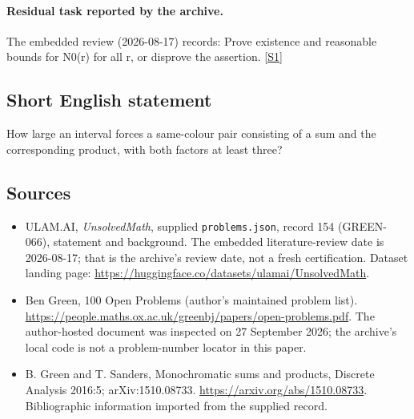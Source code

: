 \documentclass[11pt,a4paper]{article}
\newcommand{\sref}[2]{\hyperlink{source:#1:#2}{[S#2]}}
\begin{document}
\paragraph{Residual task reported by the archive.}

The embedded review (2026-08-17) records: Prove existence and reasonable bounds for N0(r) for all r, or disprove the assertion. \sref{154}{1}

\subsection{Short English statement}

How large an interval forces a same-colour pair consisting of a sum and the corresponding product, with both factors at least three?

\subsection{Sources}

{\small

\begin{itemize}

\item[\hypertarget{source:154:1}{S1}] ULAM.AI, \emph{UnsolvedMath}, supplied \texttt{problems.json}, record 154 (GREEN-066), statement and background. The embedded literature-review date is 2026-08-17; that is the archive’s review date, not a fresh certification. Dataset landing page: \url{https://huggingface.co/datasets/ulamai/UnsolvedMath}.

\item[\hypertarget{source:154:2}{S2}] Ben Green, 100 Open Problems (author’s maintained problem list). \url{https://people.maths.ox.ac.uk/greenbj/papers/open-problems.pdf}. The author-hosted document was inspected on 27 September 2026; the archive’s local code is not a problem-number locator in this paper.

\item[\hypertarget{source:154:3}{S3}] B. Green and T. Sanders, Monochromatic sums and products, Discrete Analysis 2016:5; arXiv:1510.08733. \url{https://arxiv.org/abs/1510.08733}. Bibliographic information imported from the supplied record.

\end{itemize}

}

\label{end:154}
\end{document}

